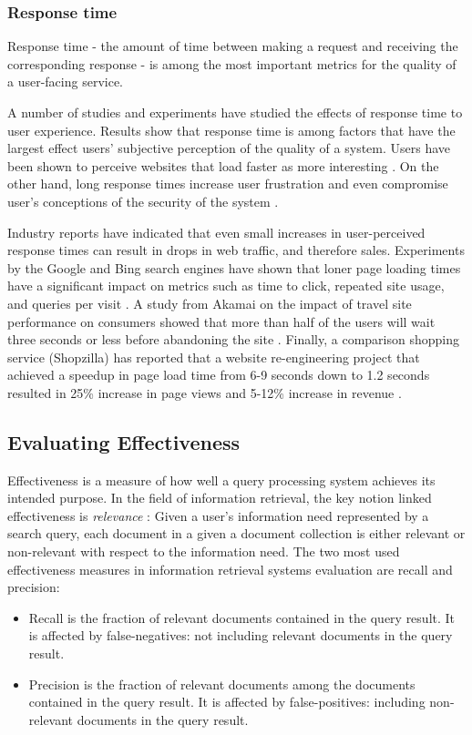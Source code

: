 \subsubsection{Response time}
Response time - the amount of time between making a request and receiving the corresponding response -
is among the most important metrics for the quality of a user-facing service.

A number of studies and experiments have studied the effects of response time to user experience.
Results show that response time is among factors that have the largest effect users' subjective perception of the
quality of a system.
Users have been shown to perceive websites that load faster as more interesting \cite{ramsay/retrievaltimesinvestigation}.
On the other hand, long response times increase user frustration \cite{ceaparu:userfrustration} and even compromise
user's conceptions of the security of the system \cite{bouch:qualityeyebeholder}.

Industry reports have indicated that even small increases in user-perceived response times can result in drops in web
traffic, and therefore sales.
Experiments by the Google and Bing search engines have shown that loner page loading times have a significant impact on
metrics such as time to click, repeated site usage, and queries per visit \cite{schurman:rerformanceuserimpact}.
A study from Akamai on the impact of travel site performance on consumers showed that more than half of the users will
wait three seconds or less before abandoning the site \cite{akamai:travelsiteperformance}.
Finally, a comparison shopping service (Shopzilla) has reported that a website re-engineering project that achieved a
speedup in page load time from 6-9 seconds down to 1.2 seconds resulted in 25\% increase in page views and 5-12\%
increase in revenue \cite{dixon:shopzillasiteredo}.

\subsection{Evaluating Effectiveness}

Effectiveness is a measure of how well a query processing system achieves its intended purpose.
In the field of information retrieval, the key notion linked effectiveness is \textit{relevance}
\cite{buttcher:informationretrieval}:
Given a user's information need represented by a search query, each document in a given a document collection is either
relevant or non-relevant with respect to the information need.
The two most used effectiveness measures in information retrieval systems evaluation are recall and precision:
\begin{itemize}
  \item Recall is the fraction of relevant documents contained in the query result.
  It is affected by false-negatives: not including relevant documents in the query result.
  \item Precision is the fraction of relevant documents among the documents contained in the query result.
  It is affected by false-positives: including non-relevant documents in the query result.
\end{itemize}

